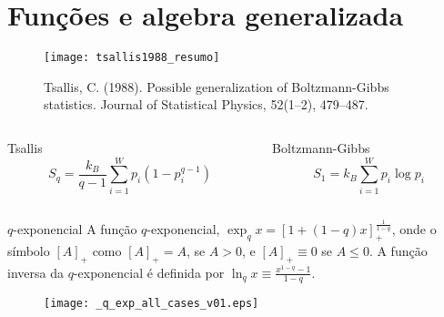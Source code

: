 \documentclass{beamer}
\begin{document}
\section{Funções e algebra generalizada}

\begin{frame}
\begin{figure}
\texttt{[image: tsallis1988\_resumo]}
\caption{Tsallis, C. (1988). Possible generalization of Boltzmann-Gibbs statistics. Journal of Statistical Physics, 52(1–2), 479–487.}
\end{figure}
\begin{columns}
\begin{column}{5cm}
\begin{block}{Tsallis}
\begin{equation}
S_q = \frac{k_B}{q-1}\sum^W_{i=1}p_i(1-p^{q-1}_i) \nonumber
\end{equation}  
\end{block}
\end{column}
\begin{column}{5cm}
\begin{block}{Boltzmann-Gibbs}
\begin{equation}
S_1 = k_B\sum^W_{i=1}p_i\log p_i \nonumber
\end{equation}
\end{block}
\end{column}
\end{columns}
\end{frame}


\begin{frame}{$q$-exponencial}
A função $q$-exponencial,
 $\exp_q x = [1+(1-q)x]_+^{\frac{1}{1-q}}$,
%
onde o símbolo $[A]_+$ como $[A]_+=A$,  se $A>0$, e $[A]_+\equiv0$ se $A\le0$.
A função inversa da $q$-exponencial é definida por 
%
 $\ln_q x \equiv \frac{x^{1-q}-1}{1-q}$.
           \begin{figure}
            \texttt{[image: \_q\_exp\_all\_cases\_v01.eps]}
	   \end{figure}
\end{frame}
\end{document}
